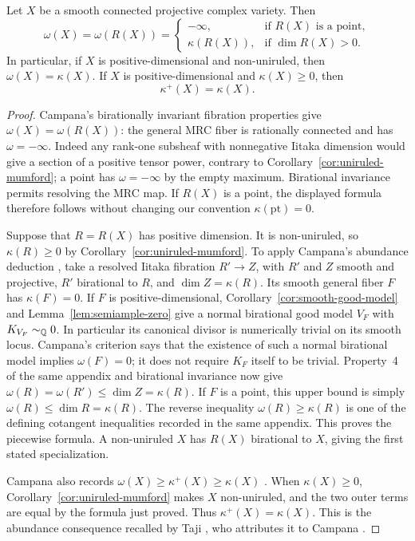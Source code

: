\begin{corollary}
\label{cor:cotangent-mrc}
Let \(X\) be a smooth connected projective complex variety. Then
\[
 \omega(X)=\omega(R(X))=
 \begin{cases}
 -\infty,&\text{if }R(X)\text{ is a point},\\
 \kappa(R(X)),&\text{if }\dim R(X)>0.
 \end{cases}
\]
In particular, if \(X\) is positive-dimensional and non-uniruled, then
\(\omega(X)=\kappa(X)\). If \(X\) is positive-dimensional and
\(\kappa(X)\geq0\), then
\[
 \kappa^+(X)=\kappa(X).
\]
\end{corollary}
\begin{proof}
Campana's birationally invariant fibration properties
\cite[Appendix~A, property~4]{Taji2014} give
\(\omega(X)=\omega(R(X))\): the general MRC fiber is rationally
connected and has \(\omega=-\infty\). Indeed any rank-one subsheaf with
nonnegative Iitaka dimension would give a section of a positive tensor
power, contrary to Corollary~\ref{cor:uniruled-mumford}; a point has
\(\omega=-\infty\) by the empty maximum. Birational invariance permits
resolving the MRC map. If \(R(X)\) is a point, the displayed formula
therefore follows without changing our convention \(\kappa(\mathrm{pt})=0\).

Suppose that \(R=R(X)\) has positive dimension. It is non-uniruled, so
\(\kappa(R)\geq0\) by Corollary~\ref{cor:uniruled-mumford}.
To apply Campana's abundance deduction
\cite[Conjecture~A.2 and Remark~A.3]{Taji2014}, take a resolved Iitaka
fibration \(R'\to Z\), with \(R'\) and \(Z\) smooth and projective,
\(R'\) birational to \(R\), and \(\dim Z=\kappa(R)\). Its smooth
general fiber \(F\) has \(\kappa(F)=0\). If \(F\) is
positive-dimensional, Corollary~\ref{cor:smooth-good-model} and
Lemma~\ref{lem:semiample-zero} give a normal birational good model
\(V_F\) with \(K_{V_F}\sim_{\mathbb{Q}}0\). In particular its canonical
divisor is numerically trivial on its smooth locus. Campana's criterion
\cite[Appendix~A, Examples~A.1(2)]{Taji2014} says that the existence of
such a normal birational model implies \(\omega(F)=0\); it does not
require \(K_F\) itself to be trivial. Property~4 of the same appendix
and birational invariance now give
\(\omega(R)=\omega(R')\leq\dim Z=\kappa(R)\).
If \(F\) is a point, this upper bound is simply
\(\omega(R)\leq\dim R=\kappa(R)\). The reverse inequality
\(\omega(R)\geq\kappa(R)\) is one of the defining cotangent inequalities
recorded in the same appendix. This proves the piecewise formula.
A non-uniruled \(X\) has \(R(X)\) birational to \(X\), giving the
first stated specialization.

Campana also records
\(\omega(X)\geq\kappa^+(X)\geq\kappa(X)\)
\cite[Appendix~A, property~2]{Taji2014}. When \(\kappa(X)\geq0\),
Corollary~\ref{cor:uniruled-mumford} makes \(X\) non-uniruled, and the
two outer terms are equal by the formula just proved. Thus
\(\kappa^+(X)=\kappa(X)\). This is the abundance consequence recalled
by Taji \cite[Theorem~1.3]{Taji2014}, who attributes it to Campana
\cite[Proposition~3.10]{Campana1995}.
\end{proof}

